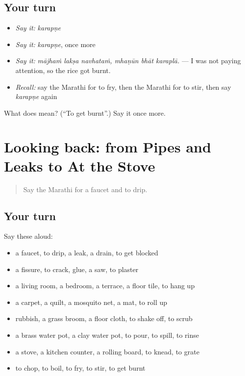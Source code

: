 \subsection*{Your turn}
\begin{itemize}
\raggedright
  \item \emph{Say it:} \emph{karapṇe}
  \item \emph{Say it:} \emph{karapṇe}, once more
  \item \emph{Say it:} \emph{mājhaṁ lakṣa navhataṁ, mhaṇūn bhāt karaplā.} — I was not paying attention, so the rice got burnt.
  \item \emph{Recall:} say the Marathi for to fry, then the Marathi for to stir, then say \emph{karapṇe} again
\end{itemize}

\begin{tcolorbox}[breakable,colback=teal!4,colframe=teal!35!black,title={Before you move on}]
What does  mean? (\textquotedblleft{}To get burnt\textquotedblright{}.) Say it once more.
\end{tcolorbox}
\section[(dialogue)]{Looking back: from Pipes and Leaks to At the Stove}

\label{lesson:MR-R527-review-520-527}



\begin{quote}
Say the Marathi for a faucet and to drip.
\end{quote}

\subsection*{Your turn}
Say these aloud:

\begin{itemize}
\raggedright
  \item a faucet, to drip, a leak, a drain, to get blocked
  \item a fissure, to crack, glue, a saw, to plaster
  \item a living room, a bedroom, a terrace, a floor tile, to hang up
  \item a carpet, a quilt, a mosquito net, a mat, to roll up
  \item rubbish, a grass broom, a floor cloth, to shake off, to scrub
  \item a brass water pot, a clay water pot, to pour, to spill, to rinse
  \item a stove, a kitchen counter, a rolling board, to knead, to grate
  \item to chop, to boil, to fry, to stir, to get burnt
\end{itemize}

